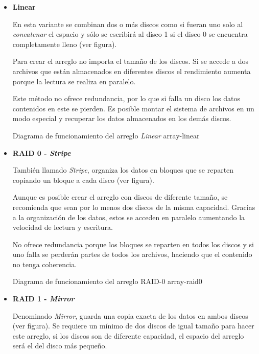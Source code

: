 \begin{itemize}

  \item \textbf{Linear}

En esta variante se combinan dos o m\'{a}s discos como si fueran uno solo al \emph{concatenar} el espacio y s\'{o}lo se escribir\'{a} al disco 1 si el disco 0 se encuentra completamente lleno (ver figura).

Para crear el arreglo no importa el tama\~{n}o de los discos. Si se accede a dos archivos que est\'{a}n almacenados en diferentes discos el rendimiento aumenta porque la lectura se realiza en paralelo.

Este m\'{e}todo no ofrece redundancia, por lo que si falla un disco los datos contenidos en este se pierden. Es posible montar el sistema de archivos en un modo especial y recuperar los datos almacenados en los dem\'{a}s discos.

\diagramblock
{Diagrama de funcionamiento del arreglo \emph{Linear}}
{array-linear}
{
 {
  
 }
}

  \item \textbf{RAID 0 - \textit{Stripe}}

Tambi\'{e}n llamado \emph{Stripe}, organiza los datos en bloques que se reparten copiando un bloque a cada disco (ver figura).

Aunque es posible crear el arreglo con discos de diferente tama\~{n}o, se recomienda que sean por lo menos dos discos de la misma capacidad. Gracias a la organizaci\'{o}n de los datos, estos se acceden en paralelo aumentando la velocidad de lectura y escritura.

No ofrece redundancia porque los bloques se reparten en todos los discos y si uno falla se perder\'{a}n partes de todos los archivos, haciendo que el contenido no tenga coherencia.

\diagramblock
{Diagrama de funcionamiento del arreglo \textsc{RAID-0}}
{array-raid0}
{
 {
  
 }
}

  \item \textbf{RAID 1 - \textit{Mirror}}

Denominado \emph{Mirror}, guarda una copia exacta de los datos en ambos discos (ver figura). Se requiere un m\'{i}nimo de dos discos de igual tama\~{n}o para hacer este arreglo, si los discos son de diferente capacidad, el espacio del arreglo ser\'{a} el del disco m\'{a}s peque\~{n}o.


\end{itemize}
